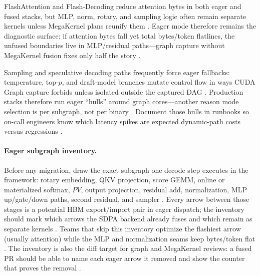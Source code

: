 FlashAttention and Flash-Decoding reduce attention bytes in both eager and fused stacks, but MLP, norm, rotary, and sampling logic often remain separate kernels unless MegaKernel plans reunify them \citep{dao2022flashattention,dao2023flashdecoding,kwon2023vllm,taxbreak2026}. Eager mode therefore remains the diagnostic surface: if attention bytes fall yet total bytes/token flatlines, the unfused boundaries live in MLP/residual paths---graph capture without MegaKernel fusion fixes only half the story \citep{memoryfloor2026,yirage2026,patel2025llminference,semianalysis2024tma,nvidia2022hopper}.

Sampling and speculative decoding paths frequently force eager fallbacks: temperature, top-$p$, and draft-model branches mutate control flow in ways CUDA Graph capture forbids unless isolated outside the captured DAG \citep{kwon2023vllm,patel2025llminference,taxbreak2026,nvidia2024cudagraphs}. Production stacks therefore run eager ``hulls'' around graph cores---another reason mode selection is per subgraph, not per binary \citep{yirage2026,chen2020compilerbasedhardw,memoryfloor2026,amd2024xdna,amd2024aie,dlbook,liu2024deepseekv3,dao2022flashattention,semianalysis2024tma,nvidia2022hopper,dao2023flashdecoding}. Document those hulls in runbooks so on-call engineers know which latency spikes are expected dynamic-path costs versus regressions \citep{patel2025llminference,taxbreak2026,memoryfloor2026,yirage2026,kwon2023vllm,nvidia2024cudagraphs,chen2020compilerbasedhardw,amd2024xdna,dlbook,liu2024deepseekv3,dao2022flashattention,amd2024aie,semianalysis2024tma,nvidia2022hopper,dao2023flashdecoding}.

\paragraph{Eager subgraph inventory.}
Before any migration, draw the exact subgraph one decode step executes in the framework: rotary embedding, QKV projection, score GEMM, online or materialized softmax, $PV$, output projection, residual add, normalization, MLP up/gate/down paths, second residual, and sampler \citep{dao2022flashattention,kwon2023vllm,patel2025llminference}. Every arrow between those stages is a potential HBM export/import pair in eager dispatch; the inventory should mark which arrows the SDPA backend already fuses and which remain as separate kernels \citep{taxbreak2026,memoryfloor2026}. Teams that skip this inventory optimize the flashiest arrow (usually attention) while the MLP and normalization seams keep bytes/token flat \citep{memoryfloor2026,yirage2026}. The inventory is also the diff target for graph and MegaKernel reviews: a fused PR should be able to name each eager arrow it removed and show the counter that proves the removal \citep{chen2020compilerbasedhardw,patel2025llminference}.

